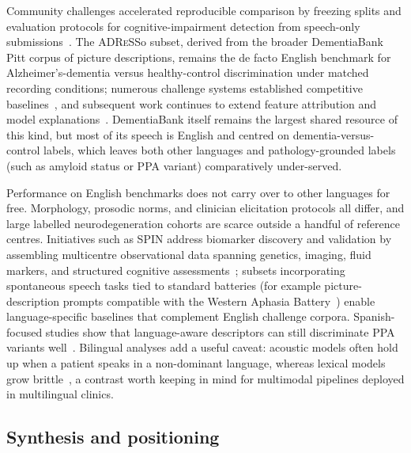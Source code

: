 Community challenges accelerated reproducible comparison by freezing splits and evaluation protocols for cognitive-impairment detection from speech-only submissions~\cite{luz2021adresso}.
The \textsc{ADReSS}o subset, derived from the broader DementiaBank Pitt corpus of picture descriptions, remains the de facto English benchmark for Alzheimer's-dementia versus healthy-control discrimination under matched recording conditions; numerous challenge systems established competitive baselines~\cite{syed2021muetrmit}, and subsequent work continues to extend feature attribution and model explanations~\cite{ntampakis2025neuroxvocal}.
DementiaBank itself remains the largest shared resource of this kind, but most of its speech is English and centred on dementia-versus-control labels, which leaves both other languages and pathology-grounded labels (such as amyloid status or PPA variant) comparatively under-served.

Performance on English benchmarks does not carry over to other languages for free. Morphology, prosodic norms, and clinician elicitation protocols all differ, and large labelled neurodegeneration cohorts are scarce outside a handful of reference centres.
Initiatives such as SPIN address biomarker discovery and validation by assembling multicentre observational data spanning genetics, imaging, fluid markers, and structured cognitive assessments~\cite{alcolea2019spin}; subsets incorporating spontaneous speech tasks tied to standard batteries (for example picture-description prompts compatible with the Western Aphasia Battery~\cite{kertesz1982wab}) enable language-specific baselines that complement English challenge corpora.
Spanish-focused studies show that language-aware descriptors can still discriminate PPA variants well~\cite{matias2019machineppa}. Bilingual analyses add a useful caveat: acoustic models often hold up when a patient speaks in a non-dominant language, whereas lexical models grow brittle~\cite{pugalenthi2024bilingualppa}, a contrast worth keeping in mind for multimodal pipelines deployed in multilingual clinics.

\subsection{Synthesis and positioning}

